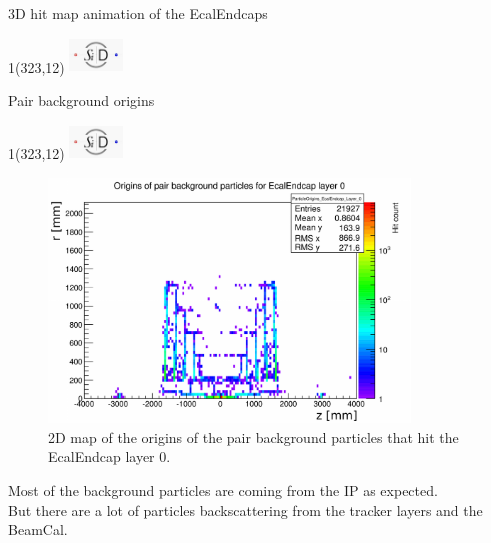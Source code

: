 \documentclass[xcolor={dvipsnames}]{beamer}
\newcommand{\sidlogo}{
  \setlength{\TPHorizModule}{1pt}
  \setlength{\TPVertModule}{1pt}
  \begin{textblock}{1}(323,12)
   \includegraphics[width=40pt,height=26pt]{figures/SiD.jpeg}
  \end{textblock}
  }
\begin{document}
\begin{frame}[t]{3D hit map animation of the EcalEndcaps}
\sidlogo
\begin{center}
\end{center}
\end{frame}

\begin{frame}{Pair background origins}
\sidlogo
  \begin{figure}
 	\begin{columns}
        \begin{flushright}
        \includegraphics[width=0.9\textwidth]{figures/sidloi3_pairs_1312_EcalEndcap_Hits_EcalEndcap_ParticleOrigins_EcalEndcap_Layer_0.pdf}
        \end{flushright}
        \begin{flushleft}
	\caption{\small 2D map of the origins of the pair background particles that hit the EcalEndcap layer 0.}
        \end{flushleft}
      \end{columns}
\end{figure}

Most of the background particles are coming from the IP as expected.\\
But there are a lot of particles backscattering from the tracker layers and the BeamCal.
\end{frame}
\end{document}
